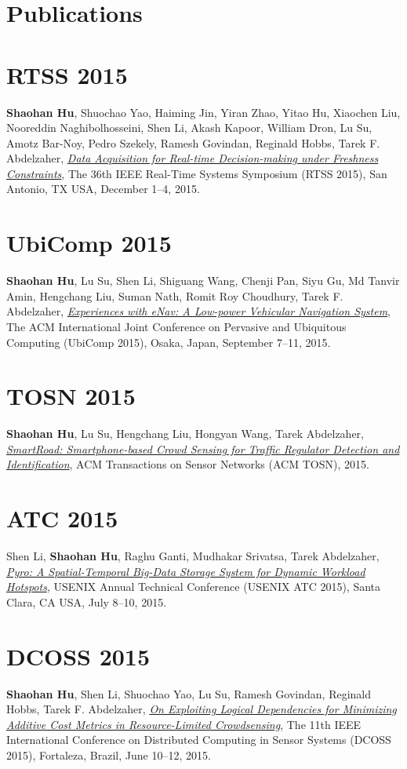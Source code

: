 \section{\sc Publications}

\section{\sc RTSS 2015}\hypertarget{hu2015rtss}{} \textbf{Shaohan Hu}, Shuochao Yao, Haiming Jin, Yiran Zhao, Yitao Hu, Xiaochen Liu, Nooreddin Naghibolhosseini, Shen Li, Akash Kapoor, William Dron, Lu Su, Amotz Bar-Noy, Pedro Szekely, Ramesh Govindan, Reginald Hobbs, Tarek F. Abdelzaher, \href{}{\emph{Data Acquisition for Real-time Decision-making under Freshness Constraints}}, \textsf{The 36th IEEE Real-Time Systems Symposium (RTSS 2015)}, San Antonio, TX USA, December 1--4, 2015.

\section{\sc UbiComp 2015}\hypertarget{hu2015ubicomp}{} \textbf{Shaohan Hu}, Lu Su, Shen Li, Shiguang Wang, Chenji Pan, Siyu Gu, Md Tanvir Amin, Hengchang Liu, Suman Nath, Romit Roy Choudhury, Tarek F. Abdelzaher, \href{}{\emph{Experiences with eNav: A Low-power Vehicular Navigation System}}, \textsf{The ACM International Joint Conference on Pervasive and Ubiquitous Computing (UbiComp 2015)}, Osaka, Japan, September 7--11, 2015.

\section{\sc TOSN 2015}\hypertarget{hu2015tosn}{} \textbf{Shaohan Hu}, Lu Su, Hengchang Liu, Hongyan Wang, Tarek Abdelzaher, \href{}{\emph{SmartRoad: Smartphone-based Crowd Sensing for Traffic Regulator Detection and Identification}}, \textsf{ACM Transactions on Sensor Networks (ACM TOSN)}, 2015.

\section{\sc ATC 2015}\hypertarget{li2015atc}{} Shen Li, \textbf{Shaohan Hu}, Raghu Ganti, Mudhakar Srivatsa, Tarek Abdelzaher, \href{}{\emph{Pyro: A Spatial-Temporal Big-Data Storage System for Dynamic Workload Hotspots}}, \textsf{USENIX Annual Technical Conference (USENIX ATC 2015)}, Santa Clara, CA USA, July 8--10, 2015.

\section{\sc DCOSS 2015}\hypertarget{hu2015dcoss}{} \textbf{Shaohan Hu}, Shen Li, Shuochao Yao, Lu Su, Ramesh Govindan, Reginald Hobbs, Tarek F. Abdelzaher, \href{}{\emph{On Exploiting Logical Dependencies for Minimizing Additive Cost Metrics in Resource-Limited Crowdsensing}}, \textsf{The 11th IEEE International Conference on Distributed Computing in Sensor Systems (DCOSS 2015)}, Fortaleza, Brazil, June 10--12, 2015.

